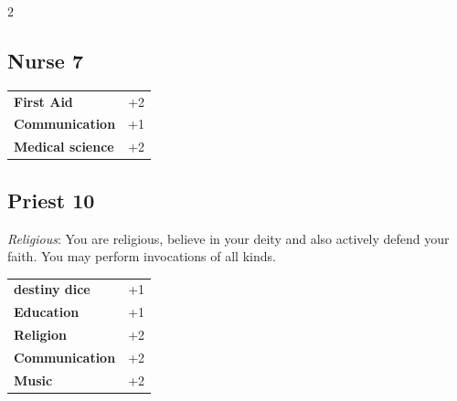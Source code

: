 \begin{multicols}{2}
\begin{tcolorbox}

\end{tcolorbox}

\begin{tcolorbox}
    \subsection*{Nurse \hfill \small{7 }}
    \tcblower




\begin{tabular}{@{}ll@{}}
    \textbf{First Aid} & +2\\
    \textbf{Communication} & +1\\
    \textbf{Medical science} & +2\\
\end{tabular}


\end{tcolorbox}

\begin{tcolorbox}
    \subsection*{Priest \hfill \small{10 }}
    \tcblower
\textit{Religious}: You are religious, believe in your deity and also actively defend your faith. You may perform invocations of all kinds.


\vspace{3mm}

\begin{tabular}{@{}ll@{}}
    \textbf{destiny dice} & +1\\
    \textbf{Education} & +1\\
    \textbf{Religion} & +2\\
    \textbf{Communication} & +2\\
    \textbf{Music} & +2\\
\end{tabular}


\end{tcolorbox}
\end{multicols}
